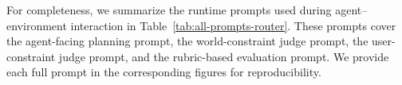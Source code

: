 For completeness, we summarize the runtime prompts used during agent--environment
interaction in Table~\ref{tab:all-prompts-router}. These prompts cover the agent-facing
planning prompt, the world-constraint judge prompt, the user-constraint judge prompt,
and the rubric-based evaluation prompt. We provide each full prompt in the corresponding
figures for reproducibility.



